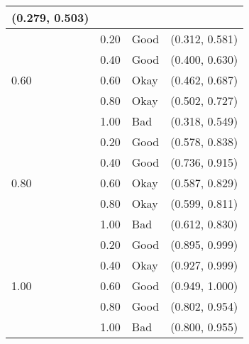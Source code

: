 \documentclass{article}
\begin{document}
{\begin{tabular}{|l|l|l|l|}
              \cellcolor{Yellow}(0.279, 0.503) \\
        \hline
        \multirow{5}{*}{0.60}
            & \cellcolor{Yellow}0.20 & \cellcolor{Yellow}Good &
              \cellcolor{Yellow}(0.312, 0.581) \\
            & \cellcolor{Green}0.40 & \cellcolor{Green}Good &
              \cellcolor{Green}(0.400, 0.630) \\
            & \cellcolor{Yellow}0.60 & \cellcolor{Yellow}Okay &
              \cellcolor{Yellow}(0.462, 0.687) \\
            & \cellcolor{Yellow}0.80 & \cellcolor{Yellow}Okay &
              \cellcolor{Yellow}(0.502, 0.727) \\
            & \cellcolor{Red}1.00 & \cellcolor{Red}Bad &
              \cellcolor{Red}(0.318, 0.549) \\
        \hline
        \multirow{5}{*}{0.80}
            & \cellcolor{Green}0.20 & \cellcolor{Green}Good &
              \cellcolor{Green}(0.578, 0.838) \\
            & \cellcolor{Green}0.40 & \cellcolor{Green}Good &
              \cellcolor{Green}(0.736, 0.915) \\
            & \cellcolor{Yellow}0.60 & \cellcolor{Yellow}Okay &
              \cellcolor{Yellow}(0.587, 0.829) \\
            & \cellcolor{Yellow}0.80 & \cellcolor{Yellow}Okay &
              \cellcolor{Yellow}(0.599, 0.811) \\
            & \cellcolor{Red}1.00 & \cellcolor{Red}Bad &
              \cellcolor{Red}(0.612, 0.830) \\
        \hline
        \multirow{5}{*}{1.00}
            & \cellcolor{Yellow}0.20 & \cellcolor{Yellow}Good &
              \cellcolor{Yellow}(0.895, 0.999) \\
            & \cellcolor{Yellow}0.40 & \cellcolor{Yellow}Okay &
              \cellcolor{Yellow}(0.927, 0.999) \\
            & \cellcolor{Green}0.60 & \cellcolor{Green}Good &
              \cellcolor{Green}(0.949, 1.000) \\
            & \cellcolor{Yellow}0.80 & \cellcolor{Yellow}Good &
              \cellcolor{Yellow}(0.802, 0.954) \\
            & \cellcolor{Red}1.00 & \cellcolor{Red}Bad &
              \cellcolor{Red}(0.800, 0.955) \\
        \hline
    \end{tabular}}
\end{document}
